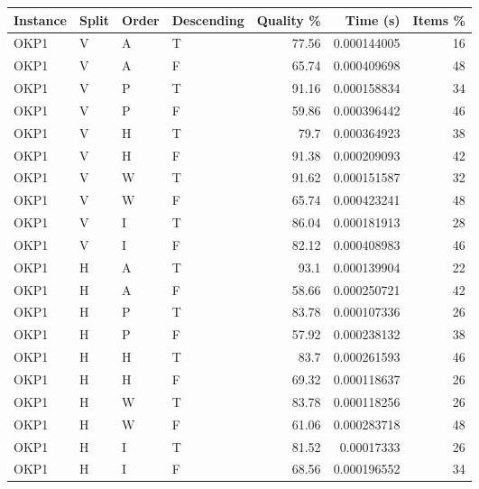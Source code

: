 \begin{tabular}{llllrrr}
    \hline
    Instance & Split & Order & Descending & Quality \% & Time (s)    & Items \% \\
    \hline
    OKP1     & V     & A     & T          & 77.56      & 0.000144005 & 16       \\
    OKP1     & V     & A     & F          & 65.74      & 0.000409698 & 48       \\
    OKP1     & V     & P     & T          & 91.16      & 0.000158834 & 34       \\
    OKP1     & V     & P     & F          & 59.86      & 0.000396442 & 46       \\
    OKP1     & V     & H     & T          & 79.7       & 0.000364923 & 38       \\
    OKP1     & V     & H     & F          & 91.38      & 0.000209093 & 42       \\
    OKP1     & V     & W     & T          & 91.62      & 0.000151587 & 32       \\
    OKP1     & V     & W     & F          & 65.74      & 0.000423241 & 48       \\
    OKP1     & V     & I     & T          & 86.04      & 0.000181913 & 28       \\
    OKP1     & V     & I     & F          & 82.12      & 0.000408983 & 46       \\
    OKP1     & H     & A     & T          & 93.1       & 0.000139904 & 22       \\
    OKP1     & H     & A     & F          & 58.66      & 0.000250721 & 42       \\
    OKP1     & H     & P     & T          & 83.78      & 0.000107336 & 26       \\
    OKP1     & H     & P     & F          & 57.92      & 0.000238132 & 38       \\
    OKP1     & H     & H     & T          & 83.7       & 0.000261593 & 46       \\
    OKP1     & H     & H     & F          & 69.32      & 0.000118637 & 26       \\
    OKP1     & H     & W     & T          & 83.78      & 0.000118256 & 26       \\
    OKP1     & H     & W     & F          & 61.06      & 0.000283718 & 48       \\
    OKP1     & H     & I     & T          & 81.52      & 0.00017333  & 26       \\
    OKP1     & H     & I     & F          & 68.56      & 0.000196552 & 34       \\

\end{tabular}

